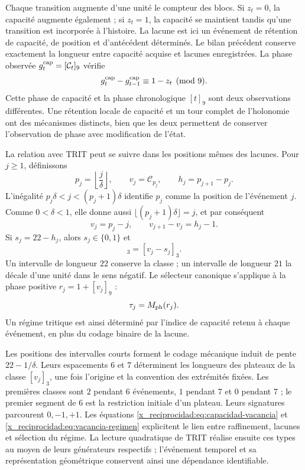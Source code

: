 Chaque transition augmente d'une unité le compteur des blocs. Si
\(z_t=0\), la capacité augmente également ; si \(z_t=1\), la capacité se
maintient tandis qu'une transition est incorporée à l'histoire. La lacune
est ici un événement de rétention de capacité, de position et
d'antécédent déterminés. Le bilan précédent conserve exactement la
longueur entre capacité acquise et lacunes enregistrées. La phase
observée \(g_t^{\rm cap}=[\mathcal C_t]_9\) vérifie
\[
 g_t^{\rm cap}-g_{t-1}^{\rm cap}\equiv1-z_t\pmod9.
\]
Cette phase de capacité et la phase chronologique \([t]_9\) sont deux
observations différentes. Une rétention locale de capacité et un tour
complet de l'holonomie ont des mécanismes distincts, bien que les deux
permettent de conserver l'observation de phase avec modification de l'état.

La relation avec TRIT peut se suivre dans les positions mêmes des lacunes.
Pour \(j\geq1\), définissons
\[
 p_j=\left\lfloor\frac j\delta\right\rfloor,\qquad
 v_j=\mathcal C_{p_j},\qquad h_j=p_{j+1}-p_j.
\]
L'inégalité \(p_j\delta<j<(p_j+1)\delta\) identifie \(p_j\)
comme la position de l'événement \(j\). Comme \(0<\delta<1\), elle donne aussi
\(\lfloor(p_j+1)\delta\rfloor=j\), et par conséquent
\[
 v_j=p_j-j,\qquad
 v_{j+1}-v_j=h_j-1.
\]
Si \(s_j=22-h_j\), alors \(s_j\in\{0,1\}\) et
\begin{equation}
 [v_{j+1}]_3=[v_j-s_j]_3.
 \label{x_reciprocidad:eq:vacancia-regimen}
\end{equation}
Un intervalle de longueur \(22\) conserve la classe ; un intervalle de longueur
\(21\) la décale d'une unité dans le sens négatif. Le sélecteur canonique
s'applique à la phase positive \(r_j=1+[v_j]_9\) :
\[
 \tau_j=M_{\rm ph}(r_j).
\]
Un régime tritique est ainsi déterminé par l'indice de capacité
retenu à chaque événement, en plus du codage binaire de la lacune.

Les positions des intervalles courts forment le codage mécanique
induit de pente \(22-1/\delta\). Leurs espacements \(6\) et \(7\)
déterminent les longueurs des plateaux de la classe \([v_j]_3\), une
fois l'origine et la convention des extrémités fixées. Les premières classes
sont \(2\) pendant \(6\) événements, \(1\) pendant \(7\) et \(0\) pendant
\(7\) ; le premier segment de \(6\) est la restriction initiale d'un plateau.
Leurs signatures parcourent \(0,-1,+1\). Les équations
\eqref{x_reciprocidad:eq:capacidad-vacancia} et \eqref{x_reciprocidad:eq:vacancia-regimen} explicitent le
lien entre raffinement, lacunes et sélection du régime. La lecture
quadratique de TRIT réalise ensuite ces types au moyen de leurs générateurs
respectifs ; l'événement temporel et sa représentation géométrique
conservent ainsi une dépendance identifiable.

